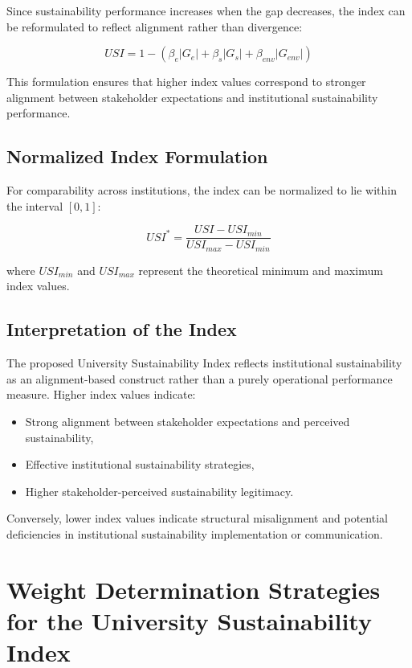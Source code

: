 \documentclass[11pt,a4paper]{article}
\begin{document}
Since sustainability performance increases when the gap decreases, the index can be reformulated to reflect alignment rather than divergence:

\begin{equation}
USI = 1 - \left( \beta_e |G_e| + \beta_s |G_s| + \beta_{env} |G_{env}| \right)
\end{equation}

This formulation ensures that higher index values correspond to stronger alignment between stakeholder expectations and institutional sustainability performance.

\subsection{Normalized Index Formulation}

For comparability across institutions, the index can be normalized to lie within the interval $[0,1]$:

\begin{equation}
USI^{*} = \frac{USI - USI_{min}}{USI_{max} - USI_{min}}
\end{equation}

where $USI_{min}$ and $USI_{max}$ represent the theoretical minimum and maximum index values.

\subsection{Interpretation of the Index}

The proposed University Sustainability Index reflects institutional sustainability as an alignment-based construct rather than a purely operational performance measure. Higher index values indicate:

\begin{itemize}
\item Strong alignment between stakeholder expectations and perceived sustainability,
\item Effective institutional sustainability strategies,
\item Higher stakeholder-perceived sustainability legitimacy.
\end{itemize}

Conversely, lower index values indicate structural misalignment and potential deficiencies in institutional sustainability implementation or communication.


\section{Weight Determination Strategies for the University Sustainability Index}
\end{document}
